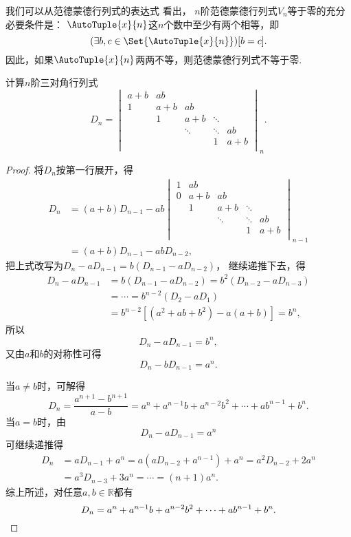 我们可以从范德蒙德行列式的表达式  看出，
\(n\)阶范德蒙德行列式\(V_n\)等于零的充分必要条件是：
\(\AutoTuple{x}{n}\)这\(n\)个数中至少有两个相等，即\[
	(\exists b,c\in\Set{\AutoTuple{x}{n}})[b=c].
\]
因此，如果\(\AutoTuple{x}{n}\)两两不等，则范德蒙德行列式不等于零.

\begin{example}\label{example:行列式的展开.三对角行列式}
计算\(n\)阶三对角行列式\[
	D_n = \begin{vmatrix}
		a+b & ab & \\
		1 & a+b & ab & \\
		& 1 & a + b & \ddots & \\
		& & \ddots & \ddots & ab \\
		& & & 1 & a+b \\
	\end{vmatrix}_n.
\]
\begin{proof}
将\(D_n\)按第一行展开，得\begin{align*}
	D_n &= (a+b) D_{n-1} - ab \begin{vmatrix}
		1 & ab \\
		0 & a+b & ab \\
		& 1 & a+b & \ddots \\
		& & \ddots & \ddots & ab \\
		& & & 1 & a+b \\
	\end{vmatrix}_{n-1} \\
	&= (a+b) D_{n-1} - ab D_{n-2},
\end{align*}
把上式改写为\(D_n - a D_{n-1} = b(D_{n-1} - a D_{n-2})\)，
继续递推下去，得\begin{align*}
	D_n - a D_{n-1} &= b(D_{n-1} - a D_{n-2}) = b^2(D_{n-2} - a D_{n-3}) \\
	&= \dotsb = b^{n-2}(D_2 - a D_1) \\
	&= b^{n-2} [(a^2 + ab + b^2) - a(a+b)] = b^n,
\end{align*}
所以\[
	D_n - a D_{n-1} = b^n,
\]
又由\(a\)和\(b\)的对称性可得\[
	D_n - b D_{n-1} = a^n.
\]

当\(a \neq b\)时，可解得\[
	D_n = \frac{a^{n+1} - b^{n+1}}{a - b}
	= a^n + a^{n-1} b + a^{n-2} b^2 + \dotsb + a b^{n-1} + b^n.
\]
当\(a = b\)时，由\[
	D_n - a D_{n-1} = a^n
\]可继续递推得\begin{align*}
	D_n &= a D_{n-1} + a^n
	= a(a D_{n-2} + a^{n-1}) + a^n
	= a^2 D_{n-2} + 2 a^n \\
	&= a^3 D_{n-3} + 3 a^n
	= \dotsb
	= (n+1) a^n.
\end{align*}
综上所述，对任意\(a,b\in\mathbb{R}\)都有\[
	D_n = a^n + a^{n-1} b + a^{n-2} b^2 + \dotsb + a b^{n-1} + b^n.
	\qedhere
\]
\end{proof}
\end{example}

